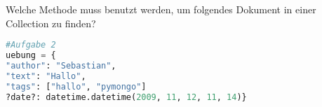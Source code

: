 Welche Methode muss benutzt werden, um  folgendes Dokument in einer Collection zu finden?
\begin{lstlisting}[language=Python]
#Aufgabe 2
uebung = {	
"author": "Sebastian",
"text": "Hallo",
"tags": ["hallo", "pymongo"]
?date?: datetime.datetime(2009, 11, 12, 11, 14)}
\end{lstlisting}\label{database02:lst:excercise2}

